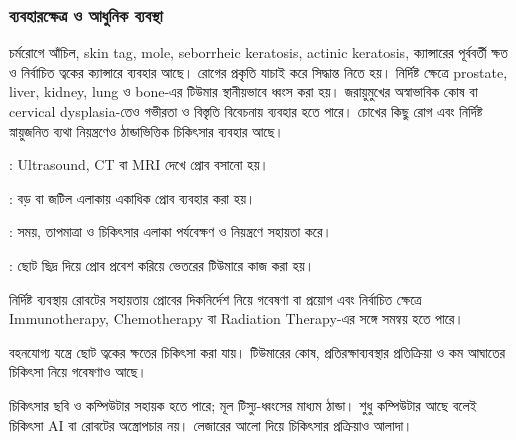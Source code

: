 \subsubsection{ব্যবহারক্ষেত্র ও আধুনিক ব্যবস্থা}
চর্মরোগে আঁচিল, skin tag, mole, seborrheic keratosis, actinic keratosis, ক্যান্সারের পূর্ববর্তী ক্ষত ও নির্বাচিত ত্বকের ক্যান্সারে ব্যবহার আছে। রোগের প্রকৃতি যাচাই করে সিদ্ধান্ত নিতে হয়। নির্দিষ্ট ক্ষেত্রে prostate, liver, kidney, lung ও bone-এর টিউমার স্থানীয়ভাবে ধ্বংস করা হয়। জরায়ুমুখের অস্বাভাবিক কোষ বা cervical dysplasia-তেও গভীরতা ও বিস্তৃতি বিবেচনায় ব্যবহার হতে পারে। চোখের কিছু রোগ এবং নির্দিষ্ট স্নায়ুজনিত ব্যথা নিয়ন্ত্রণেও ঠান্ডাভিত্তিক চিকিৎসার ব্যবহার আছে।
\begin{compactpoints}
\item {}: Ultrasound, CT বা MRI দেখে প্রোব বসানো হয়।
\item {}: বড় বা জটিল এলাকায় একাধিক প্রোব ব্যবহার করা হয়।
\item {}: সময়, তাপমাত্রা ও চিকিৎসার এলাকা পর্যবেক্ষণ ও নিয়ন্ত্রণে সহায়তা করে।
\item {}: ছোট ছিদ্র দিয়ে প্রোব প্রবেশ করিয়ে ভেতরের টিউমারে কাজ করা হয়।
\item নির্দিষ্ট ব্যবস্থায় রোবটের সহায়তায় প্রোবের দিকনির্দেশ নিয়ে গবেষণা বা প্রয়োগ এবং নির্বাচিত ক্ষেত্রে Immunotherapy, Chemotherapy বা Radiation Therapy-এর সঙ্গে সমন্বয় হতে পারে।
\item বহনযোগ্য যন্ত্রে ছোট ত্বকের ক্ষতের চিকিৎসা করা যায়। টিউমারের কোষ, প্রতিরক্ষাব্যবস্থার প্রতিক্রিয়া ও কম আঘাতের চিকিৎসা নিয়ে গবেষণাও আছে।
\end{compactpoints}
চিকিৎসার ছবি ও কম্পিউটার সহায়ক হতে পারে; মূল টিস্যু-ধ্বংসের মাধ্যম ঠান্ডা। শুধু কম্পিউটার আছে বলেই চিকিৎসা AI বা রোবটের অস্ত্রোপচার নয়। লেজারের আলো দিয়ে চিকিৎসার প্রক্রিয়াও আলাদা।
